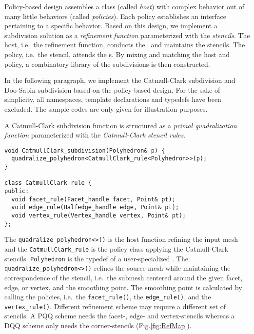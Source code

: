 Policy-based design \cite{Alexandrescu:2001:MCD} assembles a 
class (called \emph{host}) with complex behavior out of many 
little behaviors (called \emph{policies}). Each policy establishes
an interface pertaining to a specific behavior.
Based on this design, we implement a subdivision solution as 
a \emph{refinement function} parameterized with the 
\emph{stencils}. The host, i.e.\ the refinement function,
conducts the \tr\ and maintains the stencils. The policy,
i.e.\ the stencil, attends the \gm s. By mixing and matching
the host and policy, a combinatory library of the subdivisions
is then constructed. 

In the following paragraph, we implement the Catmull-Clark 
subdivision and Doo-Sabin subdivision based on the 
policy-based design. For the sake of simplicity, all 
namespaces, template declarations
and typedefs have been excluded. The sample codes are only
given for illustration purposes.

A Catmull-Clark subdivision function is structured 
as a \emph{primal quadralization function} parameterized 
with the \emph{Catmull-Clark stencil rules}.
\begin{lstlisting}
void CatmullClark_subdivision(Polyhedron& p) {
  quadralize_polyhedron<CatmullClark_rule<Polyhedron>>(p);
}

class CatmullClark_rule {
public:
  void facet_rule(Facet_handle facet, Point& pt);
  void edge_rule(Halfedge_handle edge, Point& pt);
  void vertex_rule(Vertex_handle vertex, Point& pt);
};
\end{lstlisting}
The \lstinline!quadralize_polyhedron<>()! is the host function
refining the input mesh
and the \lstinline!CatmullClark_rule!
is the policy class applying the Catmull-Clark stencils.
\lstinline!Polyhedron! is the typedef of a user-specialized
\cgalpoly . The \lstinline!quadralize_polyhedron<>()!
refines the source mesh while maintaining the 
correspondence of the stencil, i.e.\ the submesh centered 
around the given facet, edge, or
vertex, and the smoothing point. The smoothing point
is calculated by calling the policies, i.e.\
the \lstinline!facet_rule()!, the \lstinline!edge_rule()!,
and the \lstinline!vertex_rule()!.
Different refinement scheme may require a 
different set of stencils. A PQQ scheme needs the
facet-, edge- and vertex-stencils whereas a DQQ scheme 
only needs the corner-stencils (Fig.\ref{fig:RefMap}).

